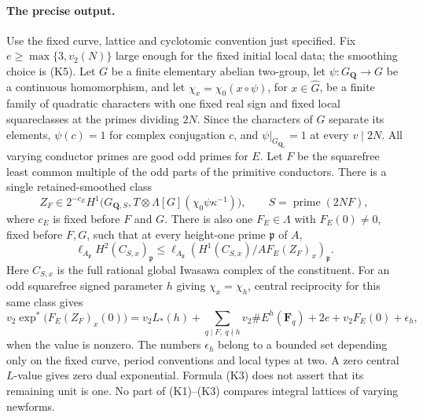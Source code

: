 \paragraph{The precise output.}
\begin{proposition}
\label{ex:app-kato-system}
Use the fixed curve, lattice and cyclotomic convention just specified.
Fix $e\ge\max\{3,v_2(N)\}$ large enough for the fixed initial local data;
the smoothing choice is (K5).
Let $G$ be a finite elementary abelian two-group, let
$\psi:G_{\mathbf Q}\to G$ be a continuous homomorphism, and let
$\chi_x=\chi_0(x\circ\psi)$, for $x\in\widehat G$, be a finite
family of quadratic characters with one fixed real sign and fixed
local squareclasses at the primes dividing $2N$.
Since the characters of $G$ separate
its elements, $\psi(c)=1$ for complex conjugation $c$, and
$\psi|_{G_{\mathbf Q_v}}=1$ at every $v\mid2N$. All varying conductor primes
are good odd primes for $E$. Let $F$ be the squarefree least common
multiple of the odd parts of the primitive conductors. There is a
single retained-smoothed class
\[
 Z_F\in 2^{-c_E}H^1\bigl(G_{\mathbf Q,S},
        T\otimes\Lambda[G](\chi_0\psi\kappa^{-1})\bigr),
 \qquad S=\operatorname{prime}(2NF),                         \tag{K1}
\]
where $c_E$ is fixed before $F$ and $G$.
There is also one $F_E\in\Lambda$ with $F_E(0)\ne0$, fixed before
$F,G$, such that at every height-one prime $\mathfrak p$ of $A$,
\[
 \ell_{A_{\mathfrak p}}H^2(C_{S,x})_{\mathfrak p}
 \leq
 \ell_{A_{\mathfrak p}}
 \left(H^1(C_{S,x})/A F_E(Z_F)_x\right)_{\mathfrak p}.       \tag{K2}
\]
Here $C_{S,x}$ is the full rational global Iwasawa complex of the
constituent. For an odd squarefree signed parameter $h$ giving
$\chi_x=\chi_h$, central reciprocity for this same class gives
\[
 v_2\exp^*\bigl(F_E(Z_F)_x(0)\bigr)
 =v_2L_*(h)+\sum_{q\mid F,\ q\nmid h}
        v_2\#E^h(\mathbf F_q)+2e+v_2F_E(0)+\epsilon_h,       \tag{K3}
\]
when the value is nonzero. The numbers $\epsilon_h$ belong to a
bounded set depending only on the fixed curve, period conventions
and local types at two. A zero central $L$-value gives zero dual
exponential. Formula (K3) does not assert that its remaining unit is
one. No part of (K1)--(K3) compares integral lattices of varying newforms.
\end{proposition}

